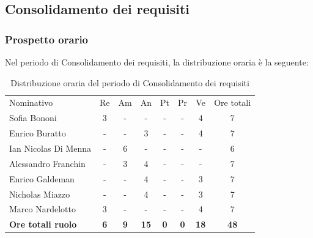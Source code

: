 \documentclass[../piano-di-progetto.tex]{subfiles}
\begin{document}
  \subsection{Consolidamento dei requisiti}

  \subsubsection{Prospetto orario}
  Nel periodo di Consolidamento dei requisiti, la distribuzione oraria è la seguente:
  \begin{table}[H]
    \centering
    \begin{tabular}{lccccccc}
      Nominativo                & Re         & Am         & An          & Pt         & Pr         & Ve          & Ore totali  \\
      Sofia Bononi              & 3          & -          & -           & -          & -          & 4           & 7           \\
      Enrico Buratto            & -          & -          & 3           & -          & -          & 4           & 7           \\
      Ian Nicolas Di Menna      & -          & 6          & -           & -          & -          & -           & 6           \\
      Alessandro Franchin       & -          & 3          & 4           & -          & -          & -           & 7           \\
      Enrico Galdeman           & -          & -          & 4           & -          & -          & 3           & 7           \\
      Nicholas Miazzo           & -          & -          & 4           & -          & -          & 3           & 7           \\
      Marco Nardelotto          & 3          & -          & -           & -          & -          & 4           & 7           \\
      \textbf{Ore totali ruolo} & \textbf{6} & \textbf{9} & \textbf{15} & \textbf{0} & \textbf{0} & \textbf{18} & \textbf{48}
      
    \end{tabular}
    \caption{Distribuzione oraria del periodo di Consolidamento dei requisiti}
  \end{table}
\end{document}
